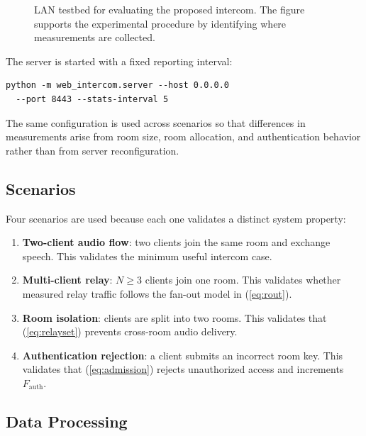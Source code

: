\documentclass[conference]{IEEEtran}
\begin{document}
\begin{figure}[t]
    \centering
    \caption{LAN testbed for evaluating the proposed intercom. The figure supports the experimental procedure by identifying where measurements are collected.}
    \label{fig:testbed}
\end{figure}

The server is started with a fixed reporting interval:
\begin{verbatim}
python -m web_intercom.server --host 0.0.0.0
  --port 8443 --stats-interval 5
\end{verbatim}
The same configuration is used across scenarios so that differences in measurements arise from room size, room allocation, and authentication behavior rather than from server reconfiguration.

\subsection{Scenarios}

Four scenarios are used because each one validates a distinct system property:
\begin{enumerate}
    \item \textbf{Two-client audio flow}: two clients join the same room and exchange speech. This validates the minimum useful intercom case.
    \item \textbf{Multi-client relay}: $N\geq3$ clients join one room. This validates whether measured relay traffic follows the fan-out model in (\ref{eq:rout}).
    \item \textbf{Room isolation}: clients are split into two rooms. This validates that (\ref{eq:relayset}) prevents cross-room audio delivery.
    \item \textbf{Authentication rejection}: a client submits an incorrect room key. This validates that (\ref{eq:admission}) rejects unauthorized access and increments $F_{\mathrm{auth}}$.
\end{enumerate}

\subsection{Data Processing}
\end{document}
